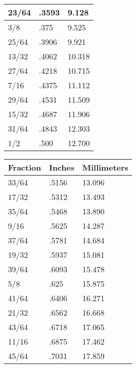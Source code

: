 \documentclass[12pt, letterpaper, oneside]{article}
\begin{document}
\begin{multicols}{2}
\begin{center}
\begin{tabular}{|l|l|l|}
23/64 & .3593 & 9.128 \tabularnewline \hline

\rowcolor[rgb]{0.85,0.85,0.85} 3/8 & .375 & 9.525 \tabularnewline \hline

25/64 & .3906 & 9.921 \tabularnewline \hline

\rowcolor[rgb]{0.85,0.85,0.85} 13/32 & .4062 & 10.318 \tabularnewline \hline

27/64 & .4218 & 10.715 \tabularnewline \hline

\rowcolor[rgb]{0.85,0.85,0.85} 7/16 & .4375 & 11.112 \tabularnewline \hline

29/64 & .4531 & 11.509 \tabularnewline \hline

\rowcolor[rgb]{0.85,0.85,0.85} 15/32 & .4687 & 11.906 \tabularnewline \hline

31/64 & .4843 & 12.303 \tabularnewline \hline

\rowcolor[rgb]{0.85,0.85,0.85} 1/2 & .500 & 12.700 \tabularnewline \hline
\end{tabular}



\begin{tabular}{|l|l|l|}
\hline

\textbf{Fraction} & \textbf{Inches} & \textbf{Millimeters} \tabularnewline \hline


33/64 & .5156 & 13.096 \tabularnewline \hline

\rowcolor[rgb]{0.85,0.85,0.85} 17/32 & .5312 & 13.493 \tabularnewline \hline

35/64 & .5468 & 13.890 \tabularnewline \hline

\rowcolor[rgb]{0.85,0.85,0.85} 9/16 & .5625 & 14.287 \tabularnewline \hline

37/64 & .5781 & 14.684 \tabularnewline \hline

\rowcolor[rgb]{0.85,0.85,0.85} 19/32 & .5937 & 15.081 \tabularnewline \hline

39/64 & .6093 & 15.478 \tabularnewline \hline

\rowcolor[rgb]{0.85,0.85,0.85} 5/8 & .625 & 15.875 \tabularnewline \hline

41/64 & .6406 & 16.271 \tabularnewline \hline

\rowcolor[rgb]{0.85,0.85,0.85} 21/32 & .6562 & 16.668 \tabularnewline \hline

43/64 & .6718 & 17.065 \tabularnewline \hline

\rowcolor[rgb]{0.85,0.85,0.85} 11/16 & .6875 & 17.462 \tabularnewline \hline

45/64 & .7031 & 17.859 \tabularnewline \hline


\end{tabular}
\end{center}
\end{multicols}
\end{document}
